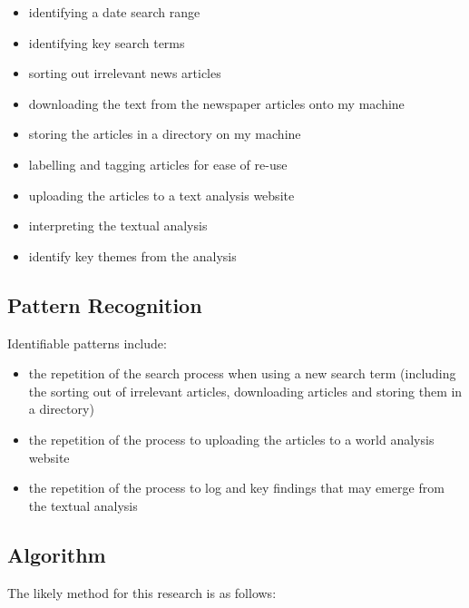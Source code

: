 \documentclass{article}
\begin{document}
\begin{itemize}
    \item identifying a date search range
    \item identifying key search terms
    \item sorting out irrelevant news articles
    \item downloading the text from the newspaper articles onto my machine
    \item storing the articles in a directory on my machine
    \item labelling and tagging articles for ease of re-use
    \item uploading the articles to a text analysis website
    \item interpreting the textual analysis
    \item identify key themes from the analysis
\end{itemize}

\subsection*{Pattern Recognition}

Identifiable patterns include:

\begin{itemize}
    \item the repetition of the search process when using a new search term (including the sorting out of irrelevant articles, downloading articles and storing them in a directory)
    \item the repetition of the process to uploading the articles to a world analysis website
    \item the repetition of the process to log and key findings that may emerge from the textual analysis
\end{itemize}

\subsection*{Algorithm}

The likely method for this research is as follows:
\end{document}
